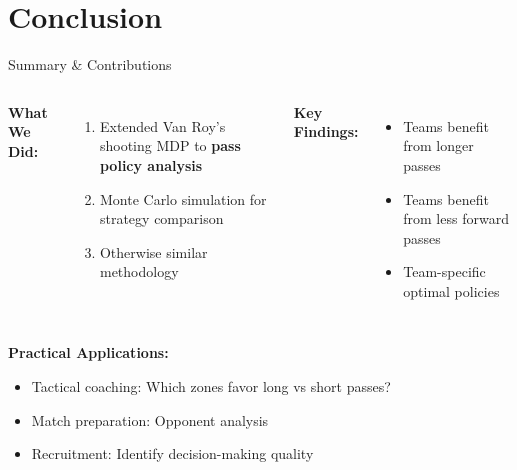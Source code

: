 \documentclass[aspectratio=169]{beamer}
\begin{document}
\section{Conclusion}

\begin{frame}{Summary \& Contributions}
\begin{columns}[T]
\textbf{What We Did:}
\begin{enumerate}
    \item Extended Van Roy's shooting MDP to \textbf{pass policy analysis}
    \item Monte Carlo simulation for strategy comparison
    \item Otherwise similar methodology
\end{enumerate}

\textbf{Key Findings:}
\begin{itemize}
    \item Teams benefit from longer passes
    \item Teams benefit from less forward passes
    \item Team-specific optimal policies
\end{itemize}
\end{columns}

\vspace{0.5cm}
\textbf{Practical Applications:}
\begin{itemize}
    \item Tactical coaching: Which zones favor long vs short passes?
    \item Match preparation: Opponent analysis
    \item Recruitment: Identify decision-making quality
\end{itemize}
\end{frame}
\end{document}
